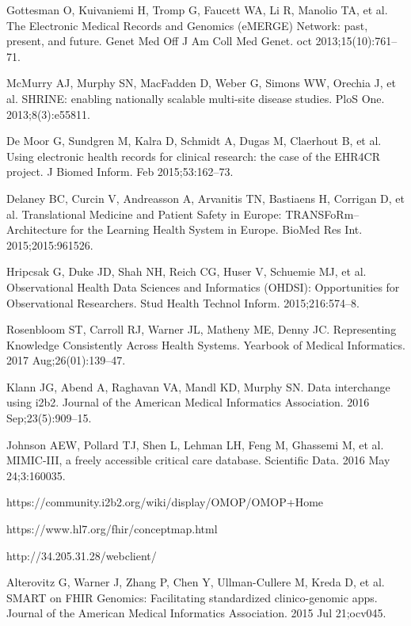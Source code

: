 \documentclass{amia}
\begin{document}

\begin{thebibliography}{1}
\setlength\itemsep{-0.1em}


Gottesman O, Kuivaniemi H, Tromp G, Faucett WA, Li R, Manolio TA, et al. The Electronic Medical Records and Genomics (eMERGE) Network: past, present, and future. Genet Med Off J Am Coll Med Genet. oct 2013;15(10):761--71.

McMurry AJ, Murphy SN, MacFadden D, Weber G, Simons WW, Orechia J, et al. SHRINE: enabling nationally scalable multi-site disease studies. PloS One. 2013;8(3):e55811.

De Moor G, Sundgren M, Kalra D, Schmidt A, Dugas M, Claerhout B, et al. Using electronic health records for clinical research: the case of the EHR4CR project. J Biomed Inform. Feb 2015;53:162--73. 

Delaney BC, Curcin V, Andreasson A, Arvanitis TN, Bastiaens H, Corrigan D, et al. Translational Medicine and Patient Safety in Europe: TRANSFoRm--Architecture for the Learning Health System in Europe. BioMed Res Int. 2015;2015:961526. 

Hripcsak G, Duke JD, Shah NH, Reich CG, Huser V, Schuemie MJ, et al. Observational Health Data Sciences and Informatics (OHDSI): Opportunities for Observational Researchers. Stud Health Technol Inform. 2015;216:574--8. 

Rosenbloom ST, Carroll RJ, Warner JL, Matheny ME, Denny JC. Representing Knowledge Consistently Across Health Systems. Yearbook of Medical Informatics. 2017 Aug;26(01):139--47. 

Klann JG, Abend A, Raghavan VA, Mandl KD, Murphy SN. Data interchange using i2b2. Journal of the American Medical Informatics Association. 2016 Sep;23(5):909–15. 

Johnson AEW, Pollard TJ, Shen L, Lehman LH, Feng M, Ghassemi M, et al. MIMIC-III, a freely accessible critical care database. Scientific Data. 2016 May 24;3:160035. 

https://community.i2b2.org/wiki/display/OMOP/OMOP+Home

https://www.hl7.org/fhir/conceptmap.html

http://34.205.31.28/webclient/

Alterovitz G, Warner J, Zhang P, Chen Y, Ullman-Cullere M, Kreda D, et al. SMART on FHIR Genomics: Facilitating standardized clinico-genomic apps. Journal of the American Medical Informatics Association. 2015 Jul 21;ocv045. 


\end{thebibliography}
\end{document}
